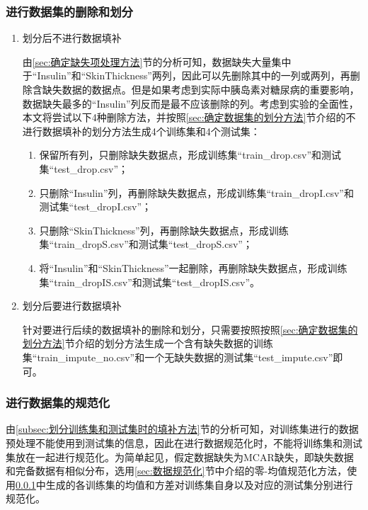 \documentclass[a4paper]{ctexart}
\begin{document}
\subsubsection{进行数据集的删除和划分}\label{sec:进行数据集的删除和划分}
\begin{enumerate}
	\item 划分后不进行数据填补

	      由\ref{sec:确定缺失项处理方法}节的分析可知，数据缺失大量集中于“Insulin”和“SkinThickness”两列，因此可以先删除其中的一列或两列，再删除含缺失数据的数据点。但是如果考虑到实际中胰岛素对糖尿病的重要影响，数据缺失最多的“Insulin”列反而是最不应该删除的列。考虑到实验的全面性，本文将尝试以下4种删除方法，并按照\ref{sec:确定数据集的划分方法}节介绍的不进行数据填补的划分方法生成4个训练集和4个测试集：
	      \begin{enumerate}[label=(\arabic*)]
		      \item 保留所有列，只删除缺失数据点，形成训练集“train\_drop.csv”和测试集“test\_drop.csv”；
		      \item 只删除“Insulin”列，再删除缺失数据点，形成训练集“train\_dropI.csv”和测试集“test\_dropI.csv”；
		      \item 只删除“SkinThickness”列，再删除缺失数据点，形成训练集“train\_dropS.csv”和测试集“test\_dropS.csv”；
		      \item 将“Insulin”和“SkinThickness”一起删除，再删除缺失数据点，形成训练集“train\_dropIS.csv”和测试集“test\_dropIS.csv”。
	      \end{enumerate}

	\item 划分后要进行数据填补

	      针对要进行后续的数据填补的删除和划分，只需要按照按照\ref{sec:确定数据集的划分方法}节介绍的划分方法生成一个含有缺失数据的训练集“train\_impute\_no.csv”和一个无缺失数据的测试集“test\_impute.csv”即可。

\end{enumerate}

\subsubsection{进行数据集的规范化}\label{sec:进行数据集的规范化}
由\ref{subsec:划分训练集和测试集时的填补方法}节的分析可知，对训练集进行的数据预处理不能使用到测试集的信息，因此在进行数据规范化时，不能将训练集和测试集放在一起进行规范化。为简单起见，假定数据缺失为MCAR缺失，即缺失数据和完备数据有相似分布，选用\ref{sec:数据规范化}节中介绍的零-均值规范化方法，使用\ref{sec:进行数据集的删除和划分}中生成的各训练集的均值和方差对训练集自身以及对应的测试集分别进行规范化。
\end{document}
